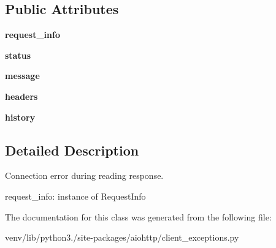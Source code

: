 \subsection*{Public Attributes}
\begin{DoxyCompactItemize}
\item 
\mbox{\label{classaiohttp_1_1client__exceptions_1_1_client_response_error_ade0817f9a905161ddcbab2f73c560faa}} 
{\bfseries request\+\_\+info}
\item 
\mbox{\label{classaiohttp_1_1client__exceptions_1_1_client_response_error_a089580871a9ec27f24d2c8c5c1893e15}} 
{\bfseries status}
\item 
\mbox{\label{classaiohttp_1_1client__exceptions_1_1_client_response_error_a4f0c5c6174272878a8c6f5b9298abd69}} 
{\bfseries message}
\item 
\mbox{\label{classaiohttp_1_1client__exceptions_1_1_client_response_error_a815ea581a0d2e2f5dbd1cff6ef48bedd}} 
{\bfseries headers}
\item 
\mbox{\label{classaiohttp_1_1client__exceptions_1_1_client_response_error_af623b2855ea3c7f6badcde45fbe31d5f}} 
{\bfseries history}
\end{DoxyCompactItemize}


\subsection{Detailed Description}
\begin{DoxyVerb}Connection error during reading response.

request_info: instance of RequestInfo
\end{DoxyVerb}
 

The documentation for this class was generated from the following file\+:\begin{DoxyCompactItemize}
\item 
venv/lib/python3./site-\/packages/aiohttp/client\+\_\+exceptions.\+py\end{DoxyCompactItemize}
